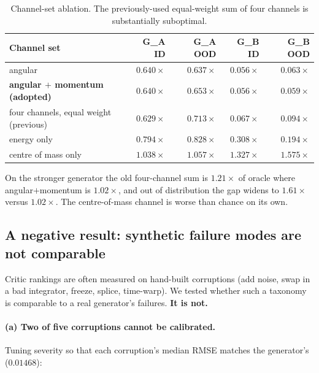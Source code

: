 \documentclass[11pt]{article}
\begin{document}
\begin{table}[t]
\centering
\small
\caption{Channel-set ablation. The previously-used equal-weight sum of four channels is
substantially suboptimal.}
\label{tab:ablation}
\begin{tabular}{lrrrr}
\toprule
Channel set & G\_A ID & G\_A OOD & G\_B ID & G\_B OOD \\
\midrule
angular & $0.640\times$ & $\mathbf{0.637\times}$ & $\mathbf{0.056\times}$ & $0.063\times$ \\
\textbf{angular $+$ momentum (adopted)} & $0.640\times$ & $0.653\times$ & $\mathbf{0.056\times}$ & $\mathbf{0.059\times}$ \\
four channels, equal weight (previous) & $0.629\times$ & $0.713\times$ & $0.067\times$ & $0.094\times$ \\
energy only & $0.794\times$ & $0.828\times$ & $0.308\times$ & $0.194\times$ \\
centre of mass only & $\mathbf{1.038\times}$ & $\mathbf{1.057\times}$ & $\mathbf{1.327\times}$ & $\mathbf{1.575\times}$ \\
\bottomrule
\end{tabular}
\end{table}

On the stronger generator the old four-channel sum is $1.21\times$ of oracle where
angular$+$momentum is $1.02\times$, and out of distribution the gap widens to
$1.61\times$ versus $1.02\times$. The centre-of-mass channel is worse than chance on its
own.

\subsection{A negative result: synthetic failure modes are not comparable}
\label{sec:taxonomy}

Critic rankings are often measured on hand-built corruptions (add noise, swap in a bad
integrator, freeze, splice, time-warp). We tested whether such a taxonomy is comparable
to a real generator's failures. \textbf{It is not.}

\paragraph{(a) Two of five corruptions cannot be calibrated.} Tuning severity so that
each corruption's median RMSE matches the generator's ($0.01468$):
\end{document}

